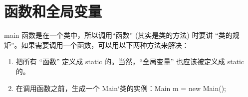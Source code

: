 \section{函数和全局变量}
	main 函数是在一个类中，所以调用``函数'' (其实是类的方法) 时要讲 ``类的规矩''。如果需要调用一个函数，可以用以下两种方法来解决：
	
	\begin{enumerate}
		\item 把所有 ``函数'' 定义成 static 的。当然，``全局变量'' 也应该被定义成 static 的。
		\item 在调用函数之前，生成一个 Main`类的实例：Main m = new Main();
	\end{enumerate}